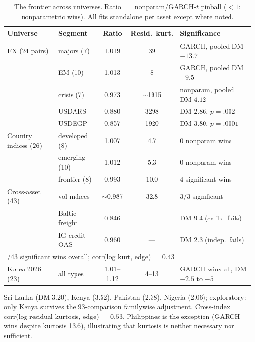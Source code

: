 \documentclass[11pt]{article}
\theoremstyle{remark}
\begin{document}
\begin{table}[t]
\centering
\begin{threeparttable}
\caption{The frontier across universes. Ratio $=$
nonparam/GARCH-$t$ pinball ($<1$: nonparametric wins). All fits
standalone per asset except where noted.}
\label{tab:universes}
\footnotesize\setlength{\tabcolsep}{4pt}
\begin{tabular}{llccl}
\toprule
Universe & Segment & Ratio & Resid.\ kurt. & Significance \\
\midrule
FX (24 pairs) & majors (7) & 1.019 & 39 & GARCH, pooled DM $-13.7$ \\
 & EM (10) & 1.013 & 8 & GARCH, pooled DM $-9.5$ \\
 & crisis (7) & 0.973 & $\sim$1915 & nonparam, pooled DM $4.12$ \\
 & \quad USDARS & 0.880 & 3298 & DM $2.86$, $p=.002$ \\
 & \quad USDEGP & 0.857 & 1920 & DM $3.80$, $p=.0001$ \\
\midrule
Country indices (26) & developed (8) & 1.007 & 4.7 & 0 nonparam wins \\
 & emerging (10) & 1.012 & 5.3 & 0 nonparam wins \\
 & frontier (8) & 0.993 & 10.0 & 4 significant wins\tnote{a} \\
\midrule
Cross-asset (43) & vol indices & $\sim$0.987 & 32.8 & 3/3 significant \\
 & Baltic freight & 0.846 & --- & DM $9.4$ (calib.\ fails) \\
 & IG credit OAS & 0.960 & --- & DM $2.3$ (indep.\ fails) \\
\multicolumn{5}{l}{\quad 13/43 significant wins overall; corr(log kurt, edge) $= 0.43$} \\
\midrule
Korea 2026 (23) & all types & 1.01--1.12 & 4--13 & GARCH wins all, DM $-2.5$ to $-5$ \\
\bottomrule
\end{tabular}
\begin{tablenotes}\footnotesize
\item[a] Sri Lanka (DM 3.20), Kenya (3.52), Pakistan (2.38), Nigeria (2.06); exploratory: only Kenya survives the 93-comparison
familywise adjustment. Cross-index corr(log residual kurtosis, edge) $= 0.53$.
Philippines is the exception (GARCH wins despite kurtosis 13.6),
illustrating that kurtosis is neither necessary nor sufficient.
\end{tablenotes}
\end{threeparttable}
\end{table}
\end{document}
